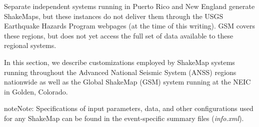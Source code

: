 \documentclass[letterpaper,10pt,english]{sphinxmanual}
\begin{document}
Separate independent systems running in Puerto Rico and New England generate
ShakeMaps, but these instances do not deliver them through the USGS Earthquake
Hazards Program webpages (at the time of this writing). GSM covers these regions, but
does not yet access the full set of data available to these regional
systems.

In this section, we describe customizations employed by ShakeMap systems running
throughout the Advanced National Seismic System (ANSS) regions
nationwide as well as the Global ShakeMap (GSM) system running at the NEIC in
Golden, Colorado.

\begin{notice}{note}{Note:}
Specifications of input parameters, data, and other configurations
used for any ShakeMap can be found in the event-specific summary
files (\emph{info.xml}).
\end{notice}
\end{document}
